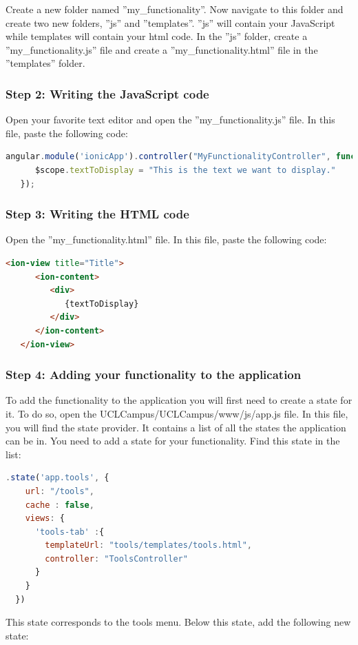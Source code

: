 \documentclass[11pt, a4paper]{report}
\begin{document}
Create a new folder named ''my\_functionality''. Now navigate to this folder and create two new folders, ''js'' and ''templates''. ''js'' will contain your JavaScript while templates will contain your html code. In the ''js'' folder, create a ''my\_functionality.js'' file and create a ''my\_functionality.html'' file in the ''templates'' folder.

\subsubsection{Step 2: Writing the JavaScript code}

Open your favorite text editor and open the ''my\_functionality.js'' file. In this file, paste the following code:

\begin{lstlisting}[language=JavaScript]
   angular.module('ionicApp').controller("MyFunctionalityController", function($scope) {
      $scope.textToDisplay = "This is the text we want to display."
   });
\end{lstlisting} 

\subsubsection{Step 3: Writing the HTML code}

Open the ''my\_functionality.html'' file.   In this file, paste the following code:

\begin{lstlisting}[language=HTML]
   <ion-view title="Title">
      <ion-content>
         <div>
            {textToDisplay}
         </div>
      </ion-content>
   </ion-view>	
\end{lstlisting} 

\subsubsection{Step 4: Adding your functionality to the application}

To add the functionality to the application you will first need to create a state for it. To do so, open the UCLCampus/UCLCampus/www/js/app.js file. In this file, you will find the state provider. It contains a list of all the states the application can be in. You need to add a state for your functionality. Find this state in the list:


\begin{lstlisting}[language=JavaScript]
.state('app.tools', {
    url: "/tools",
    cache : false,
    views: {
      'tools-tab' :{
        templateUrl: "tools/templates/tools.html",
        controller: "ToolsController"
      }
    }
  })
\end{lstlisting} 
This state corresponds to the tools menu. Below this state, add the following new state:
\end{document}
